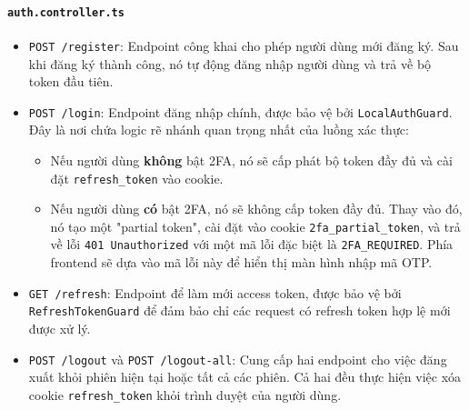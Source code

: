 \paragraph{\texttt{auth.controller.ts}}
\begin{itemize}
    \item \texttt{POST /register}: Endpoint công khai cho phép người dùng mới đăng ký. Sau khi đăng ký thành công, nó tự động đăng nhập người dùng và trả về bộ token đầu tiên.
    
    \item \texttt{POST /login}: Endpoint đăng nhập chính, được bảo vệ bởi \texttt{LocalAuthGuard}. Đây là nơi chứa logic rẽ nhánh quan trọng nhất của luồng xác thực:
    \begin{itemize}
        \item Nếu người dùng \textbf{không} bật 2FA, nó sẽ cấp phát bộ token đầy đủ và cài đặt \texttt{refresh\_token} vào cookie.
        \item Nếu người dùng \textbf{có} bật 2FA, nó sẽ không cấp token đầy đủ. Thay vào đó, nó tạo một "partial token", cài đặt vào cookie \texttt{2fa\_partial\_token}, và trả về lỗi \texttt{401 Unauthorized} với một mã lỗi đặc biệt là \texttt{2FA\_REQUIRED}. Phía frontend sẽ dựa vào mã lỗi này để hiển thị màn hình nhập mã OTP.
    \end{itemize}
    
    \item \texttt{GET /refresh}: Endpoint để làm mới access token, được bảo vệ bởi \texttt{RefreshTokenGuard} để đảm bảo chỉ các request có refresh token hợp lệ mới được xử lý.
    
    \item \texttt{POST /logout} và \texttt{POST /logout-all}: Cung cấp hai endpoint cho việc đăng xuất khỏi phiên hiện tại hoặc tất cả các phiên. Cả hai đều thực hiện việc xóa cookie \texttt{refresh\_token} khỏi trình duyệt của người dùng.
\end{itemize}